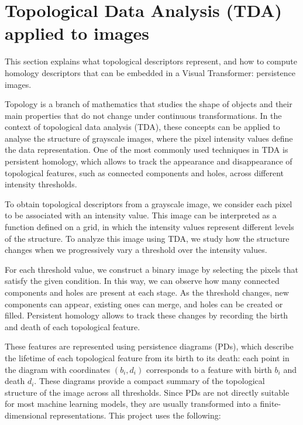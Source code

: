 \documentclass[ENG]{TFUOC}%
\begin{document}
\section{Topological Data Analysis (TDA) applied to images}\label{TDA}

This section explains what topological descriptors represent, and  how to compute homology descriptors that can be embedded in a Visual Transformer: persistence images. 

Topology is a branch of mathematics that studies the shape of objects and their main properties that do not change under continuous transformations. In the context of topological data analysis (TDA), these concepts can be applied to analyse the structure of grayscale images, where the pixel intensity values define the data representation. One of the most commonly used techniques in TDA is persistent homology, which allows to track the appearance and disappearance of topological features, such as connected components and holes, across different intensity thresholds.\cite{tfg}

To obtain topological descriptors from a grayscale image, we consider each pixel to be associated with an intensity value. This image can be interpreted as a function defined on a grid, in which the intensity values represent different levels of the structure. To analyze this image using TDA, we study how the structure changes when we progressively vary a threshold over the intensity values.

For each threshold value, we construct a binary image by selecting the pixels that satisfy the given condition. In this way, we can observe how many connected components and holes are present at each stage. As the threshold changes, new components can appear, existing ones can merge, and holes can be created or filled. Persistent homology allows to track these changes by recording the birth and death of each topological feature.

These features are represented using persistence diagrams (PDs), which describe the lifetime of each topological feature from its birth to its death: each point in the diagram with coordinates $(b_i, d_i)$ corresponds to a feature with birth $b_i$ and death $d_i$. These diagrams provide a compact summary of the topological structure of the image across all thresholds. Since PDs are not directly suitable for most machine learning models, they are usually transformed into a finite-dimensional representations. This project uses the following:
\end{document}
